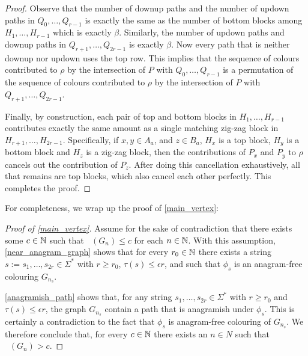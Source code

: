 \documentclass{patmorin}
\DeclareMathOperator{\afcn}{\dot{\chi}_\pi}
\begin{document}
\begin{proof}
    Observe that the number of downup paths and the number of updown paths in $Q_0,\ldots,Q_{r-1}$ is exactly the same as the number of bottom blocks among $H_1,\ldots,H_{r-1}$ which is exactly $\beta$.  Similarly, the number of updown paths and downup paths in $Q_{r+1},\ldots,Q_{2r-1}$ is exactly $\beta$.  Now every path that is neither downup nor updown uses the top row.  This implies that the sequence of colours contributed to $\rho$ by  the intersection of $P$ with $Q_0,\ldots,Q_{r-1}$ is a permutation of the sequence of colours contributed to $\rho$ by the intersection of $P$ with $Q_{r+1},\ldots,Q_{2r-1}$.

    Finally, by construction, each pair of top and bottom blocks in $H_1,\ldots,H_{r-1}$ contributes exactly the same amount as a single matching zig-zag block in $H_{r+1},\ldots,H_{2r-1}$.  Specifically, if $x,y\in A_a$, and $z\in B_a$, $H_x$ is a top block, $H_y$ is a bottom block and $H_z$ is a zig-zag block, then the contributions of $P_x$ and $P_y$ to $\rho$ cancels out the contribution of $P_z$. After doing this cancellation exhaustively, all that remains are top blocks, which also cancel each other perfectly.  This completes the proof.
\end{proof}


For completeness, we wrap up the proof of \cref{main_vertex}:

\begin{proof}[Proof of \cref{main_vertex}]
    Assume for the sake of contradiction that there exists some $c\in\mathbb{N}$ such that $\afcn(G_n)\le c$ for each $n\in\mathbb{N}$.  With this assumption, \cref{near_anagram_graph} shows that for every $r_0\in\mathbb{N}$ there exists a string $s:=s_1,\ldots,s_{2r}\in\Sigma^*$ with $r\ge r_0$, $\tau(s)\le\epsilon r$, and such that $\phi_s$ is an anagram-free colouring $G_{n_s}$.

    \cref{anagramish_path} shows that, for any string $s_1,\ldots,s_{2r}\in\Sigma^*$ with $r\ge r_0$ and $\tau(s)\le\epsilon r$, the graph $G_{n_s}$ contain a path that is anagramish under $\phi_s$.  This is certainly a contradiction to the fact that $\phi_s$ is anagram-free colouring of $G_{n_s}$. We therefore conclude that, for every $c\in\mathbb{N}$ there exists an $n\in N$ such that $\afcn(G_n)> c$.
\end{proof}

\end{document}

